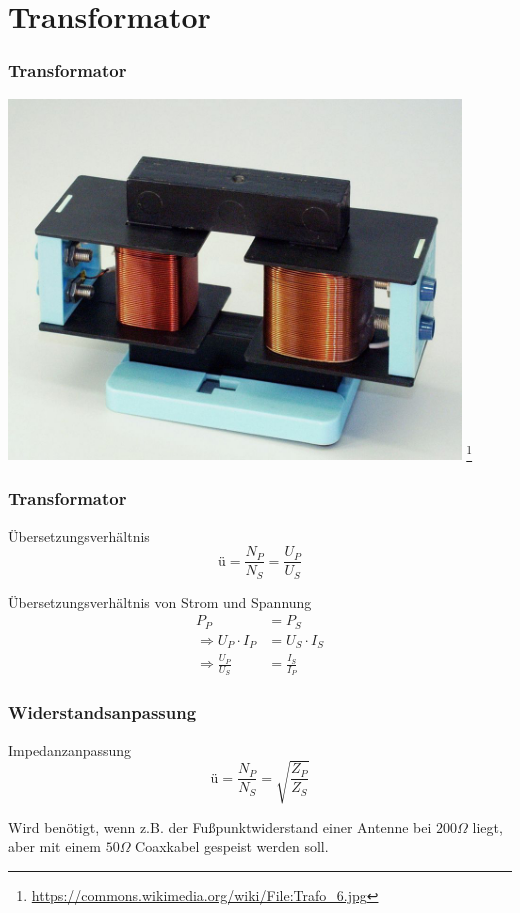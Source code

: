 \section*{Transformator}
\begin{frame}
  \frametitle{Transformator}
  \begin{center}
    \includegraphics[width=0.9\textwidth,height=.8\textheight,keepaspectratio]{a03/trafo-Real.jpg}
    \footnote{\tiny \url{https://commons.wikimedia.org/wiki/File:Trafo_6.jpg}}
  \end{center}
\end{frame}

\begin{frame}
  \frametitle{Transformator}
  \begin{block}{Übersetzungsverhältnis}
    $$\text{\"u} = \frac{N_P}{N_S} = \frac{U_P}{U_S} $$
  \end{block}
  \vspace{2em}
  \begin{block}{Übersetzungsverhältnis von Strom und Spannung}
    \begin{align*}
    P_P &= P_S\\
    \Rightarrow U_{P} \cdot I_P &= U_{S} \cdot I_S\\
    \Rightarrow \frac{U_P}{U_S} &= \frac{I_S}{I_P}
  \end{align*}
  \end{block}
\end{frame}

\begin{frame}
  \frametitle{Widerstandsanpassung}
  \begin{block}{Impedanzanpassung}
    $$\text{\"u} = \frac{N_P}{N_S} = \sqrt{\frac{Z_P}{Z_S}}$$
  \end{block}
  \vspace{2em}
  Wird benötigt, wenn z.B. der Fußpunktwiderstand einer Antenne bei $200\Omega$ liegt, aber mit einem $50\Omega$ Coaxkabel gespeist werden soll.
\end{frame}

